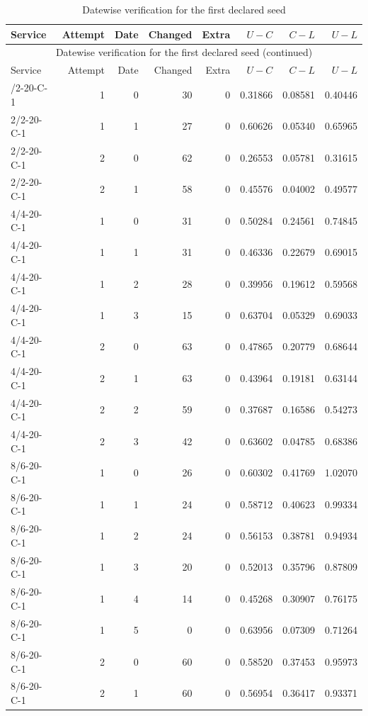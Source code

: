 \begingroup\small\setlength{\tabcolsep}{3pt}
\begin{longtable}{lrrrrrrr}
\caption{Datewise verification for the first declared seed}\label{tab:date-ledger57}\\
\hline
Service & Attempt & Date & Changed & Extra & $U-C$ & $C-L$ & $U-L$ \\
\hline
\endfirsthead
\multicolumn{8}{c}{Datewise verification for the first declared seed (continued)}\\
\hline
Service & Attempt & Date & Changed & Extra & $U-C$ & $C-L$ & $U-L$ \\
\hline
\endhead
\hline
\endfoot
2/2-20-C-1 & 1 & 0 & 30 & 0 & 0.31866 & 0.08581 & 0.40446 \\
2/2-20-C-1 & 1 & 1 & 27 & 0 & 0.60626 & 0.05340 & 0.65965 \\
2/2-20-C-1 & 2 & 0 & 62 & 0 & 0.26553 & 0.05781 & 0.31615 \\
2/2-20-C-1 & 2 & 1 & 58 & 0 & 0.45576 & 0.04002 & 0.49577 \\
4/4-20-C-1 & 1 & 0 & 31 & 0 & 0.50284 & 0.24561 & 0.74845 \\
4/4-20-C-1 & 1 & 1 & 31 & 0 & 0.46336 & 0.22679 & 0.69015 \\
4/4-20-C-1 & 1 & 2 & 28 & 0 & 0.39956 & 0.19612 & 0.59568 \\
4/4-20-C-1 & 1 & 3 & 15 & 0 & 0.63704 & 0.05329 & 0.69033 \\
4/4-20-C-1 & 2 & 0 & 63 & 0 & 0.47865 & 0.20779 & 0.68644 \\
4/4-20-C-1 & 2 & 1 & 63 & 0 & 0.43964 & 0.19181 & 0.63144 \\
4/4-20-C-1 & 2 & 2 & 59 & 0 & 0.37687 & 0.16586 & 0.54273 \\
4/4-20-C-1 & 2 & 3 & 42 & 0 & 0.63602 & 0.04785 & 0.68386 \\
8/6-20-C-1 & 1 & 0 & 26 & 0 & 0.60302 & 0.41769 & 1.02070 \\
8/6-20-C-1 & 1 & 1 & 24 & 0 & 0.58712 & 0.40623 & 0.99334 \\
8/6-20-C-1 & 1 & 2 & 24 & 0 & 0.56153 & 0.38781 & 0.94934 \\
8/6-20-C-1 & 1 & 3 & 20 & 0 & 0.52013 & 0.35796 & 0.87809 \\
8/6-20-C-1 & 1 & 4 & 14 & 0 & 0.45268 & 0.30907 & 0.76175 \\
8/6-20-C-1 & 1 & 5 & 0 & 0 & 0.63956 & 0.07309 & 0.71264 \\
8/6-20-C-1 & 2 & 0 & 60 & 0 & 0.58520 & 0.37453 & 0.95973 \\
8/6-20-C-1 & 2 & 1 & 60 & 0 & 0.56954 & 0.36417 & 0.93371 \\

\end{longtable}
